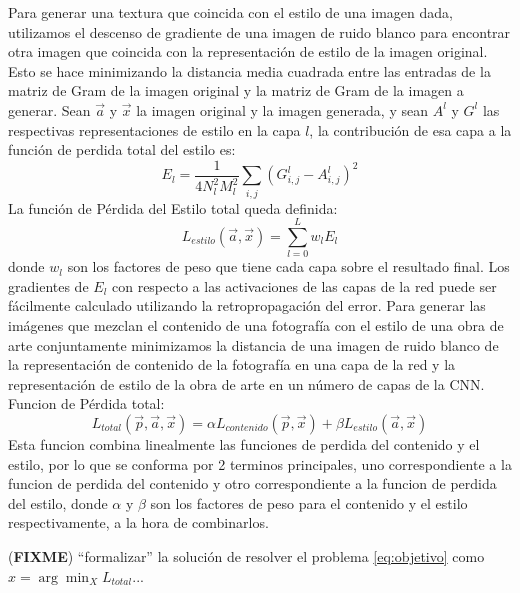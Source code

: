 \documentclass[a4paper,11pt,spanish]{book}
\newcommand*{\FIXME}[1]{{(\textbf{FIXME}) {#1}}}
\begin{document}
      Para generar una textura que coincida con el estilo de una imagen dada, utilizamos el descenso de gradiente de una imagen de ruido blanco para encontrar otra imagen que coincida
      con la representación de estilo de la imagen original. Esto se hace minimizando la distancia media cuadrada entre las entradas de la matriz de Gram de la imagen
      original y la matriz de Gram de la imagen a generar. Sean $\overrightarrow{a}$ y $\overrightarrow{x}$ la imagen original y la imagen generada, y sean $A^l$ y $G^l$
      las respectivas representaciones de estilo en la capa $l$, la contribución de esa capa a la función de perdida total del estilo es:
      \begin{equation}
       E_l = \frac{1}{4 N_l^2 M_l^2} \sum_{i,j} (G_{i,j}^l - A_{i,j}^l)^2
      \end{equation}
      La función de Pérdida del Estilo total queda definida:
      \begin{equation}
       L_{estilo}(\overrightarrow{a},\overrightarrow{x}) = \sum_{l=0}^{L} w_l E_l
      \end{equation}
      donde $w_l$ son los factores de peso que tiene cada capa sobre el resultado final. Los gradientes de $E_l$ con respecto a las activaciones de las capas de la red puede ser fácilmente
      calculado utilizando la retropropagación del error.
      Para generar las imágenes que mezclan el contenido de una fotografía con el estilo de una obra de arte conjuntamente minimizamos la distancia de una imagen de ruido blanco
      de la representación de contenido de la fotografía en una capa de la red y la representación de estilo de la obra de arte en un número de capas de la CNN.
      Funcion de Pérdida total:
      \begin{equation}\label{eq:objetivo}
       L_{total}(\overrightarrow{p},\overrightarrow{a},\overrightarrow{x}) = \alpha L_{contenido}(\overrightarrow{p},\overrightarrow{x}) + \beta L_{estilo}(\overrightarrow{a},\overrightarrow{x})
      \end{equation}
      Esta funcion combina linealmente las funciones de perdida del contenido y el estilo, por lo que se conforma por 2 terminos principales, uno correspondiente a la funcion de perdida
      del contenido y otro correspondiente a la funcion de perdida del estilo, donde $\alpha$ y $\beta$ son los factores de peso para el contenido y el estilo respectivamente, 
      a la hora de combinarlos.

      \FIXME{``formalizar'' la solución de resolver el problema
        \eqref{eq:objetivo} como $\hat x = \arg\min_X L_{total}...$}
\end{document}
